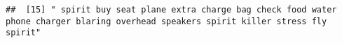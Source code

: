 \documentclass[
]{article}
\begin{document}
\begin{verbatim}
##  [15] " spirit buy seat plane extra charge bag check food water phone charger blaring overhead speakers spirit killer stress fly spirit"                                                                                                                                                                                                                                                                                                                                                                                                                                                                                                                                                                                                                                                                                                                                                                                                                                                                                                                                                                                                                                                                                                                                                                                                                                                                                                                                                                                                                                                                                                                                                                                                                                                              

\end{verbatim}
\end{document}
